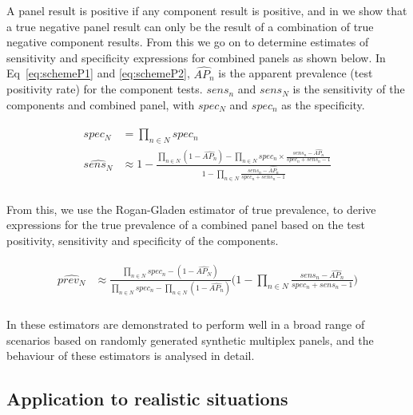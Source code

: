 \documentclass[10pt,letterpaper]{article}
\begin{document}
A panel result is positive if any component result is positive, and in  we show that a true negative panel result can only be the result of a combination of true negative component results. From this we go on to determine estimates of sensitivity and specificity expressions for combined panels as shown below. In Eq~\ref{eq:schemeP1} and \ref{eq:schemeP2}, \(\widehat{AP_n}\)  is the apparent prevalence (test positivity rate) for the component tests. \(sens_n\) and \(sens_N\) is the sensitivity of the components and combined panel, with \(spec_N\) and \(spec_n\) as the specificity.

\begin{eqnarray}
\label{eq:schemeP1}
\begin{aligned}
spec_N &= \prod_{n \in N}{spec_n} \\
\widehat{sens_N} &\approx 1-\frac{
  \prod_{n \in N}{(1-\widehat{AP_n})} - \prod_{n \in N}{spec_n \times \frac{sens_n-\widehat{AP_n}}{spec_n + sens_n - 1}}
}{
  1 - \prod_{n \in N}{ \frac{sens_n-\widehat{AP_n}}{spec_n + sens_n - 1} }
} \\
\end{aligned}
\end{eqnarray}

From this, we use the Rogan-Gladen estimator of true prevalence\cite{rogan1978}, to derive expressions for the true prevalence of a combined panel based on the test positivity, sensitivity and specificity of the components.

\begin{eqnarray}
\label{eq:schemeP2}
\begin{aligned}
\widehat{prev_{N}} &\approx \frac{
    \prod_{n \in N}{spec_n} -(1-\widehat{AP_{N}})
  }{
    \prod_{n \in N}{spec_n}
    -\prod_{n \in N}{(1-\widehat{AP_n})}
  } \bigg(1 - \prod_{n \in N}{ \frac{sens_n-\widehat{AP_n}}{spec_n + sens_n - 1} } \bigg ) \\
\end{aligned}
\end{eqnarray}

In  these estimators are demonstrated to perform well in a broad range of scenarios based on randomly generated synthetic multiplex panels, and the behaviour of these estimators is analysed in detail.

\subsection*{Application to realistic situations}
\end{document}
